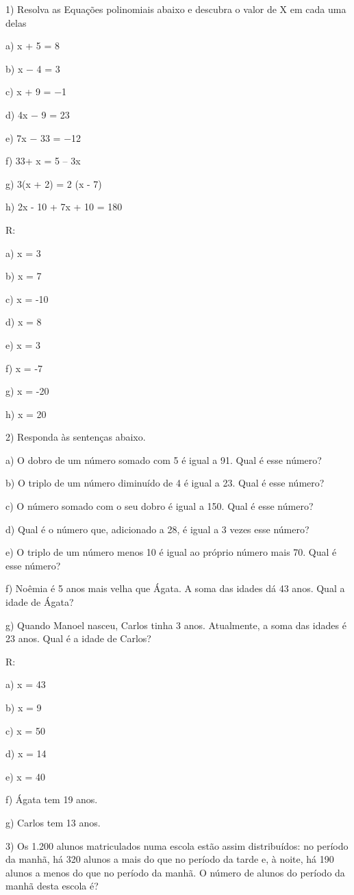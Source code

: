 1) Resolva as Equações polinomiais abaixo e descubra o valor de X em
cada uma delas

a) x + 5 = 8

b) x − 4 = 3

c) x + 9 = −1

d) 4x − 9 = 23

e) 7x − 33 = −12

f) 33+ x = 5 -- 3x

g) 3(x + 2) = 2 (x - 7)

h) 2x - 10 + 7x + 10 = 180

R:

a) x = 3

b) x = 7

c) x = -10

d) x = 8

e) x = 3

f) x = -7

g) x = -20

h) x = 20

2) Responda às sentenças abaixo.

a) O dobro de um número somado com 5 é igual a 91. Qual é esse número?

b) O triplo de um número diminuído de 4 é igual a 23. Qual é esse
número?

c) O número somado com o seu dobro é igual a 150. Qual é esse número?

d) Qual é o número que, adicionado a 28, é igual a 3 vezes esse número?

e) O triplo de um número menos 10 é igual ao próprio número mais 70.
Qual é esse número?

f) Noêmia é 5 anos mais velha que Ágata. A soma das idades dá 43 anos.
Qual a idade de Ágata?

g) Quando Manoel nasceu, Carlos tinha 3 anos. Atualmente, a soma das
idades é 23 anos. Qual é a idade de Carlos?

R:

a) x = 43

b) x = 9

c) x = 50

d) x = 14

e) x = 40

f) Ágata tem 19 anos.

g) Carlos tem 13 anos.

3) Os 1.200 alunos matriculados numa escola estão assim distribuídos: no
período da manhã, há 320 alunos a mais do que no período da tarde e, à
noite, há 190 alunos a menos do que no período da manhã. O número de
alunos do período da manhã desta escola é?

